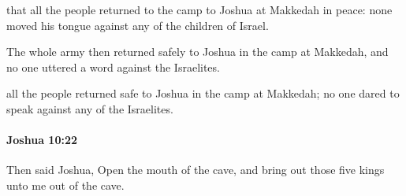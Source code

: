 			\begin{versebox}
					\item[BHS] 
					\item[ASV] that all the people returned to the camp to Joshua at Makkedah in peace: none moved his tongue against any of the children of Israel.
					\item[NIV] The whole army then returned safely to Joshua in the camp at Makkedah, and no one uttered a word against the Israelites.
					\item[NRSV] all the people returned safe to Joshua in the camp at Makkedah; no one dared to speak against any of the Israelites.
			\end{versebox}

		\paragraph{Joshua 10:22} %
			\label{JOSHUA-10-22}

			Then said Joshua, Open the mouth of the cave, and bring out those five kings unto me out of the cave.

